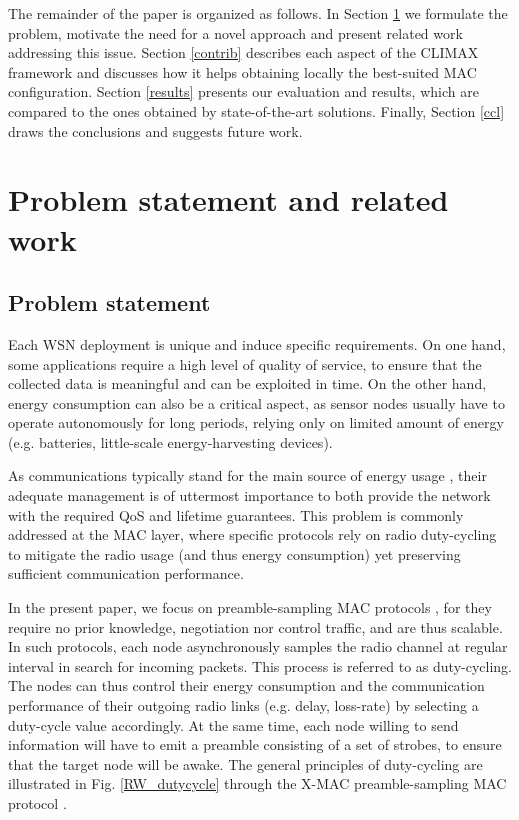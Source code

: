 \documentclass[12pt,journal,compsoc]{IEEEtran}
\begin{document}
The remainder of the paper is organized as follows. In Section \ref{RW} we formulate the problem, motivate the need for a novel approach and present related work addressing this issue. Section \ref{contrib} describes each aspect of the CLIMAX framework and discusses how it helps obtaining locally the best-suited MAC configuration. Section \ref{results} presents
our evaluation and results, which are compared to the ones obtained by state-of-the-art solutions. Finally, Section \ref{ccl} draws the conclusions and suggests future work.

\section{Problem statement and related work}
\label{RW}


\subsection{Problem statement}
Each WSN deployment is unique and induce specific requirements. On one hand, some applications require a high level of quality of service, to ensure that the collected data is meaningful and can be exploited in time. On the other hand, energy consumption can also be a critical aspect, as sensor nodes usually have to operate autonomously for long periods, relying only on limited amount of energy (e.g. batteries, little-scale energy-harvesting devices).

As communications typically stand for the main source of energy usage \cite{ass02wireless}, their adequate management is of uttermost importance to both provide the network with the required QoS and lifetime guarantees. This problem is commonly addressed at the MAC layer, where specific protocols rely on radio duty-cycling to mitigate the radio usage (and thus energy consumption) yet preserving sufficient communication performance. 

In the present paper, we focus on preamble-sampling MAC protocols \cite{cbs11low}, for they require no prior knowledge, negotiation nor control traffic, and are thus scalable. In such protocols, each node asynchronously samples the radio channel at regular interval in search for incoming packets. This process is referred to as duty-cycling. The nodes can thus control their
energy consumption and the communication performance of their outgoing radio links (e.g. delay, loss-rate) by selecting a duty-cycle value accordingly. At the same time, each node willing to send information will have to emit a preamble consisting of a set of strobes, to ensure that the target node will be awake. The general principles of duty-cycling are illustrated in Fig. \ref{RW_dutycycle} through the X-MAC preamble-sampling MAC protocol \cite{bya06xmac}.
\end{document}
